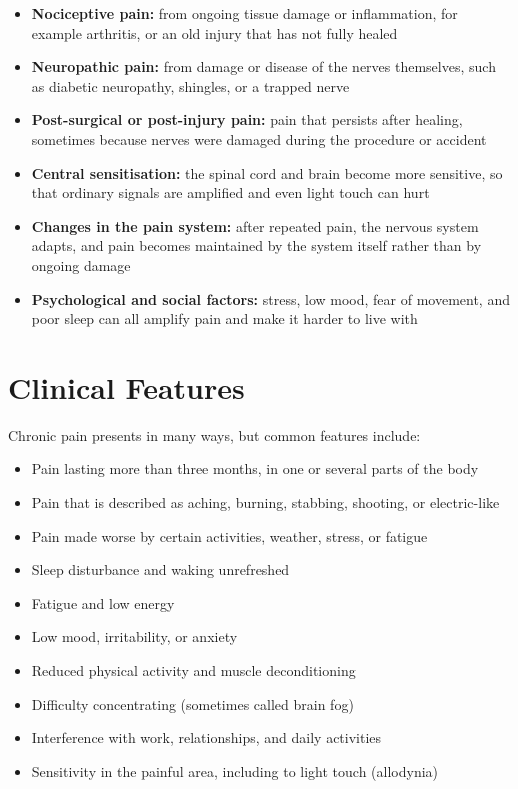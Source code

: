 \begin{itemize}
    \item \textbf{Nociceptive pain:} from ongoing tissue damage or inflammation, for example arthritis, or an old injury that has not fully healed
    \item \textbf{Neuropathic pain:} from damage or disease of the nerves themselves, such as diabetic neuropathy, shingles, or a trapped nerve
    \item \textbf{Post-surgical or post-injury pain:} pain that persists after healing, sometimes because nerves were damaged during the procedure or accident
    \item \textbf{Central sensitisation:} the spinal cord and brain become more sensitive, so that ordinary signals are amplified and even light touch can hurt
    \item \textbf{Changes in the pain system:} after repeated pain, the nervous system adapts, and pain becomes maintained by the system itself rather than by ongoing damage
    \item \textbf{Psychological and social factors:} stress, low mood, fear of movement, and poor sleep can all amplify pain and make it harder to live with
\end{itemize}

\section*{Clinical Features}
Chronic pain presents in many ways, but common features include:

\begin{itemize}
    \item Pain lasting more than three months, in one or several parts of the body
    \item Pain that is described as aching, burning, stabbing, shooting, or electric-like
    \item Pain made worse by certain activities, weather, stress, or fatigue
    \item Sleep disturbance and waking unrefreshed
    \item Fatigue and low energy
    \item Low mood, irritability, or anxiety
    \item Reduced physical activity and muscle deconditioning
    \item Difficulty concentrating (sometimes called brain fog)
    \item Interference with work, relationships, and daily activities
    \item Sensitivity in the painful area, including to light touch (allodynia)
\end{itemize}

